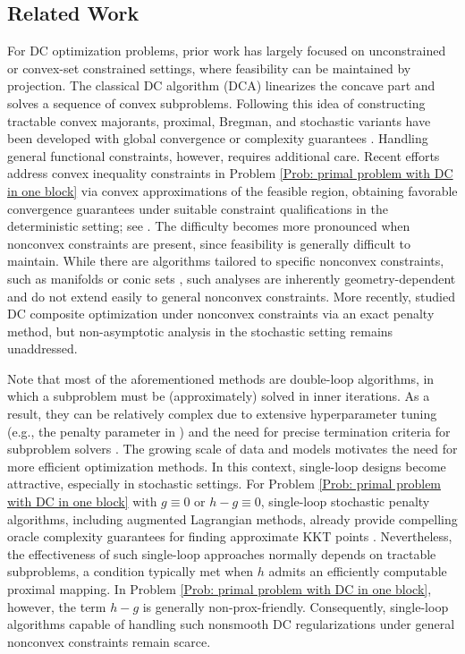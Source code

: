 \documentclass{article}
\theoremstyle{plain}
\theoremstyle{definition}
\theoremstyle{remark}
\numberwithin{equation}{section}
\begin{document}
\subsection{Related Work}
For DC optimization problems, prior work has largely focused on unconstrained or convex-set constrained settings, where feasibility can be maintained by projection. The classical DC algorithm (DCA) \citep{tao1986algorithms} linearizes the concave part and solves a sequence of convex subproblems. Following this idea of constructing tractable convex majorants, proximal, Bregman, and stochastic variants have been developed with global convergence or complexity guarantees \citep{wen2018proximal,liu2019refined,yang2025nonmonotone,liu2022inexact,yang2025inexact,nitanda2017stochastic,xu2019stochastic}. Handling general functional constraints, however, requires additional care. Recent efforts address convex inequality constraints in Problem \eqref{Prob: primal problem with DC in one block} via convex approximations of the feasible region, obtaining favorable convergence guarantees under suitable constraint qualifications in the deterministic setting; see \citep{kanzow2025adaptive,liu2025convergence,yu2021convergence}. The difficulty becomes more pronounced when nonconvex constraints are present, since feasibility is generally difficult to maintain. While there are algorithms tailored to specific nonconvex constraints, such as manifolds \citep{bergmann2024difference,jiang2025inexact} or conic sets \citep{xu2025smoothing}, such analyses are inherently geometry-dependent and do not extend easily to general nonconvex constraints. More recently, \citet{LeThiHuynhDinh2024MOR} studied DC composite optimization under nonconvex constraints via an exact penalty method, but non-asymptotic analysis in the stochastic setting remains unaddressed.

Note that most of the aforementioned methods are double-loop algorithms, in which a subproblem must be (approximately) solved in inner iterations. As a result, they can be relatively complex due to extensive hyperparameter tuning (e.g., the penalty parameter in \citep[Algorithm 3,][]{LeThiHuynhDinh2024MOR}) and the need for precise termination criteria for subproblem solvers \citep[e.g.,][]{yu2021convergence,liu2022inexact}. The growing scale of data and models motivates the need for more efficient optimization methods. In this context, single-loop designs become attractive, especially in stochastic settings.
For Problem \eqref{Prob: primal problem with DC in one block} with \(g\equiv 0\) or \(h-g\equiv 0\), single-loop stochastic penalty algorithms, including augmented Lagrangian methods, already provide compelling oracle complexity guarantees for finding approximate KKT points \citep{Alacaoglu2023ComplexityOS,shi2025momentum,liu2025single,lu2024variancereducedfirstordermethodsdeterministically}. Nevertheless, the effectiveness of such single-loop approaches normally depends on tractable subproblems, a condition typically met when \(h\) admits an efficiently computable proximal mapping. In Problem \eqref{Prob: primal problem with DC in one block}, however, the term \(h - g\) is generally non-prox-friendly. Consequently, single-loop algorithms capable of handling such nonsmooth DC regularizations under general nonconvex constraints remain scarce.
\end{document}
